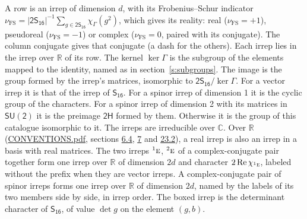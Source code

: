 \documentclass[10pt,a4paper]{article}
\numberwithin{equation}{section}
\newcommand{\grp}[1]{\mathsf{#1}}
\newcommand{\irr}[1]{\text{\normalfont\scshape #1}}
\newcommand{\conjpair}[1]{{}^{#1}}
\newcommand{\irchar}[1]{\chi_{#1}}
\newcommand{\fsind}{\nu_{\mathrm{FS}}}
\begin{document}
\leavevmode\label{n:index.frobenius}\label{n:head.irrep}\label{n:head.reality}A row is an irrep of dimension $d$, with its Frobenius--Schur indicator $\fsind = |\grp{2S_{16}}|^{-1}\allowbreak\sum_{g\in\grp{2S_{16}}}\irchar{\Gamma}(g^2)$, which gives its reality: real ($\fsind = +1$), pseudoreal ($\fsind = -1$) or complex ($\fsind = 0$, paired with its conjugate). \label{n:head.conjugate}The column conjugate gives that conjugate (a dash for the others). \label{n:head.over.real}Each irrep lies in the irrep over $\mathbb{R}$ of its row. \label{n:head.kernel}The kernel $\ker\Gamma$ is the subgroup of the elements mapped to the identity, named as in section~\ref{s:subgroups}. \label{n:head.image}The image is the group formed by the irrep's matrices, isomorphic to $\grp{2S_{16}}/\ker\Gamma$. For a vector irrep it is that of the irrep of \href{../../../rotation/data/pdf/S16.pdf}{$\grp{S_{16}}$}. For a spinor irrep of dimension 1 it is the cyclic group of the characters. For a spinor irrep of dimension 2 with its matrices in $\grp{SU(2)}$ it is the preimage $\grp{2H}$ formed by them. Otherwise it is the group of this catalogue isomorphic to it. The irreps are irreducible over $\mathbb{C}$. Over $\mathbb{R}$ (\href{../../CONVENTIONS.pdf}{CONVENTIONS.pdf}, sections \href{../../../rotation/CONVENTIONS.pdf\#conv.6.4}{6.4}, \href{../../../rotation/CONVENTIONS.pdf\#conv.7}{7} and \href{../../CONVENTIONS.pdf\#conv.23.2}{23.2}), a real irrep is also an irrep in a basis with real matrices. The two irreps $\conjpair{1}\irr{e}$, $\conjpair{2}\irr{e}$ of a complex-conjugate pair together form one irrep over $\mathbb{R}$ of dimension $2d$ and character $2\operatorname{Re}\irchar{\conjpair{1}\irr{e}}$, labeled without the prefix when they are vector irreps. A complex-conjugate pair of spinor irreps forms one irrep over $\mathbb{R}$ of dimension $2d$, named by the labels of its two members side by side, in irrep order. \label{n:mark.determinant}The boxed irrep is the determinant character of \href{../../../rotation/data/pdf/S16.pdf}{$\grp{S_{16}}$}, of value $\det g$ on the element $(g, b)$.
\setlength{\emergencystretch}{2em}\par\setlength{\emergencystretch}{0pt}
\end{document}
